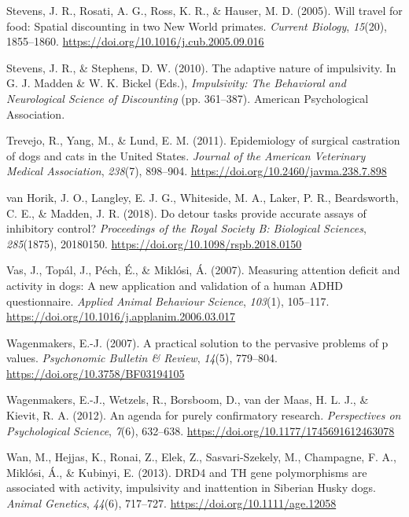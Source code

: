 \documentclass[
  pub,floatsintext]{apa6}
\newlength{\cslhangindent}
\newlength{\cslentryspacingunit} %
\newenvironment{CSLReferences}[2] %
 {%
  \setlength{\parindent}{0pt}
  \ifodd #1
  \let\oldpar\par
  \def\par{\hangindent=\cslhangindent\oldpar}
  \fi
  \setlength{\parskip}{#2\cslentryspacingunit}
 }%
 {}
\begin{document}
\begin{CSLReferences}{1}{0}
\leavevmode{}%
Stevens, J. R., Rosati, A. G., Ross, K. R., \& Hauser, M. D. (2005). Will travel for food: Spatial discounting in two {New World} primates. \emph{Current Biology}, \emph{15}(20), 1855--1860. \url{https://doi.org/10.1016/j.cub.2005.09.016}

\leavevmode{}%
Stevens, J. R., \& Stephens, D. W. (2010). The adaptive nature of impulsivity. In G. J. Madden \& W. K. Bickel (Eds.), \emph{Impulsivity: {The Behavioral} and {Neurological Science} of {Discounting}} (pp. 361--387). {American Psychological Association}.

\leavevmode{}%
Trevejo, R., Yang, M., \& Lund, E. M. (2011). Epidemiology of surgical castration of dogs and cats in the {United States}. \emph{Journal of the American Veterinary Medical Association}, \emph{238}(7), 898--904. \url{https://doi.org/10.2460/javma.238.7.898}

\leavevmode{}%
van Horik, J. O., Langley, E. J. G., Whiteside, M. A., Laker, P. R., Beardsworth, C. E., \& Madden, J. R. (2018). Do detour tasks provide accurate assays of inhibitory control? \emph{Proceedings of the Royal Society B: Biological Sciences}, \emph{285}(1875), 20180150. \url{https://doi.org/10.1098/rspb.2018.0150}

\leavevmode{}%
Vas, J., Topál, J., Péch, É., \& Miklósi, Á. (2007). Measuring attention deficit and activity in dogs: {A} new application and validation of a human {ADHD} questionnaire. \emph{Applied Animal Behaviour Science}, \emph{103}(1), 105--117. \url{https://doi.org/10.1016/j.applanim.2006.03.017}

\leavevmode{}%
Wagenmakers, E.-J. (2007). A practical solution to the pervasive problems of p values. \emph{Psychonomic Bulletin \& Review}, \emph{14}(5), 779--804. \url{https://doi.org/10.3758/BF03194105}

\leavevmode{}%
Wagenmakers, E.-J., Wetzels, R., Borsboom, D., van der Maas, H. L. J., \& Kievit, R. A. (2012). An agenda for purely confirmatory research. \emph{Perspectives on Psychological Science}, \emph{7}(6), 632--638. \url{https://doi.org/10.1177/1745691612463078}

\leavevmode{}%
Wan, M., Hejjas, K., Ronai, Z., Elek, Z., Sasvari-Szekely, M., Champagne, F. A., Miklósi, Á., \& Kubinyi, E. (2013). {DRD4} and {TH} gene polymorphisms are associated with activity, impulsivity and inattention in {Siberian Husky} dogs. \emph{Animal Genetics}, \emph{44}(6), 717--727. \url{https://doi.org/10.1111/age.12058}


\end{CSLReferences}
\end{document}
